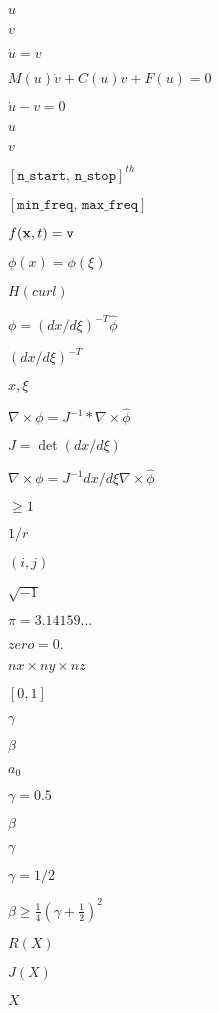 \documentclass{article}
\begin{document}
$u$
\pagebreak

$v$
\pagebreak

$ \dot{u} = v$
\pagebreak

$ M(u)\dot{v} + C(u)v + F(u) = 0 $
\pagebreak

$ \dot{u} - v = 0 $
\pagebreak

$ u $
\pagebreak

$ v $
\pagebreak

$ [ \texttt{n\_start, n\_stop} ]^{th} $
\pagebreak

$ [ \texttt{min\_freq, max\_freq} ] $
\pagebreak

$ f(\mathbf{x},t) = \mbox{\texttt{v}} $
\pagebreak

$ \phi(x) = \phi(\xi) $
\pagebreak

$ H(curl) $
\pagebreak

$ \phi = (dx/d\xi)^{-T} \hat{\phi} $
\pagebreak

$ (dx/d\xi)^{-T} $
\pagebreak

$ x, \xi $
\pagebreak

$ \nabla \times \phi = J^{-1} * \nabla \times \hat{\phi} $
\pagebreak

$ J = \det( dx/d\xi ) $
\pagebreak

$ \nabla \times \phi = J^{-1} dx/d\xi \nabla \times \hat{\phi} $
\pagebreak

$ \ge 1 $
\pagebreak

$ 1/r $
\pagebreak

$ (i,j) $
\pagebreak

$ \sqrt{-1} $
\pagebreak

$ \pi=3.14159... $
\pagebreak

$ zero=0. $
\pagebreak

$ nx \times ny \times nz $
\pagebreak

$ [0,1] $
\pagebreak

$\gamma$
\pagebreak

$\beta$
\pagebreak

$a_0$
\pagebreak

$\gamma=0.5$
\pagebreak

$ \beta $
\pagebreak

$ \gamma $
\pagebreak

$ \gamma = 1/2 $
\pagebreak

$ \beta \ge \frac{1}{4} \left( \gamma + \frac{1}{2}\right)^2 $
\pagebreak

$ R(X) $
\pagebreak

$ J(X) $
\pagebreak

$ X $
\pagebreak
\end{document}
